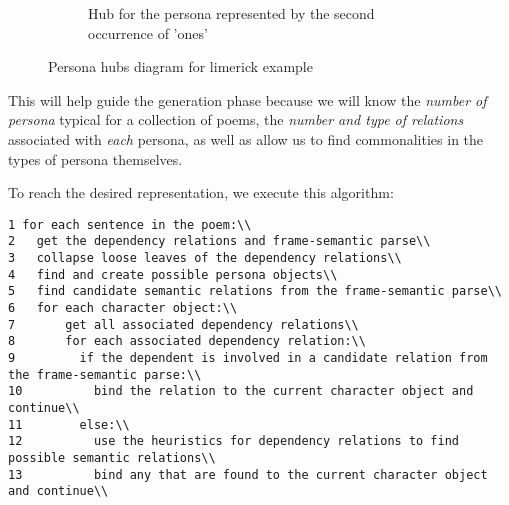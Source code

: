 \begin{figure*}[t!]
\begin{subfigure}[t]{0.45\textwidth}
            \caption{Hub for the persona represented by the second occurrence of 'ones'}
        \end{subfigure}
    \caption{Persona hubs diagram for limerick example}
    \label{fig:limerick-hubs}
\end{figure*}

This will help guide the generation phase because we will know the \textit{number of persona} typical for a collection of poems, the \textit{number and type of relations} associated with \textit{each} persona, as well as allow us to find commonalities in the types of persona themselves.

To reach the desired representation, we execute this algorithm:

\begin{verbatim}
1 for each sentence in the poem:\\
2   get the dependency relations and frame-semantic parse\\
3   collapse loose leaves of the dependency relations\\
4   find and create possible persona objects\\
5   find candidate semantic relations from the frame-semantic parse\\
6   for each character object:\\
7       get all associated dependency relations\\
8       for each associated dependency relation:\\
9         if the dependent is involved in a candidate relation from the frame-semantic parse:\\
10          bind the relation to the current character object and continue\\
11		  else:\\
12          use the heuristics for dependency relations to find possible semantic relations\\
13			bind any that are found to the current character object and continue\\
\end{verbatim}


